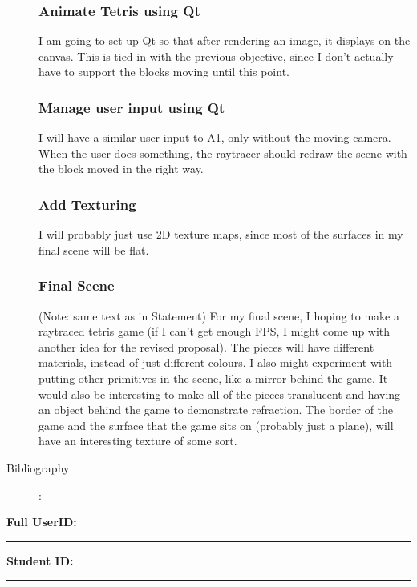 \documentclass {article}
\begin{document}
\begin{description}
\subsubsection*{Animate Tetris using Qt}
    I am going to set up Qt so that after rendering an image, it displays on the canvas.
    This is tied in with the previous objective, since I don't actually have to 
    support the blocks moving until this point.

\subsubsection*{Manage user input using Qt}
    I will have a similar user input to A1, only without the moving camera. When the 
    user does something, the raytracer should redraw the scene with the block moved
    in the right way.

\subsubsection*{Add Texturing}
    I will probably just use 2D texture maps, since most of the surfaces in my final
    scene will be flat.

\subsubsection*{Final Scene}
    (Note: same text as in Statement)
    For my final scene, I hoping to make a raytraced tetris game (if I can't
    get enough FPS, I might come up with another idea for the revised proposal). The pieces
    will have different materials, instead of just different colours. I also might
    experiment with putting other primitives in the scene, like a mirror behind the
    game. It would also be interesting to make all of the pieces translucent and having
    an object behind the game to demonstrate refraction. The border of the game and the
    surface that the game sits on (probably just a plane), will have an interesting texture
    of some sort.

\item[Bibliography]:
    

    

\end{description}
\newpage



{\hfill{\bf Full UserID:\rule{2in}{.1mm}}\hfill{\bf Student ID:\rule{2in}{.1mm}}\hfill}
\end{document}
